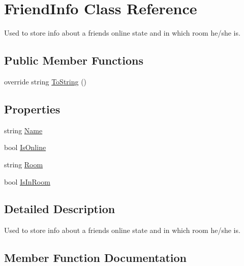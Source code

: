 \hypertarget{class_friend_info}{}\section{Friend\+Info Class Reference}
\label{class_friend_info}


Used to store info about a friend\textquotesingle{}s online state and in which room he/she is.  


\subsection*{Public Member Functions}
\begin{DoxyCompactItemize}
\item 
override string \hyperlink{class_friend_info_a33b6ef199b025fda1898b8063f43b713}{To\+String} ()
\end{DoxyCompactItemize}
\subsection*{Properties}
\begin{DoxyCompactItemize}
\item 
string \hyperlink{class_friend_info_a9126b3a854a21d428ad1af0eda981bfd}{Name}
\item 
bool \hyperlink{class_friend_info_a62a8cc42bf1e25a3f8d2fdf7adbedeb3}{Is\+Online}
\item 
string \hyperlink{class_friend_info_a40b0b66eced3c5d88c29f6a7409d1315}{Room}
\item 
bool \hyperlink{class_friend_info_abe22fa87b796bce51e9250c46464e057}{Is\+In\+Room}
\end{DoxyCompactItemize}


\subsection{Detailed Description}
Used to store info about a friend\textquotesingle{}s online state and in which room he/she is. 



\subsection{Member Function Documentation}
